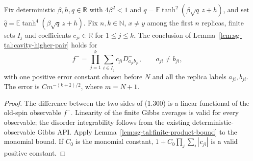 \begin{lemma}
\label{lem:sg-tal:cavity-higher-linear}
\leanok
{}
Fix deterministic $\beta,h,q\in\mathbb R$ with $4\beta^2<1$ and
$q=\mathbb E\tanh^2(\beta\sqrt q\,z+h)$, and set
$\widehat q=\mathbb E\tanh^4(\beta\sqrt q\,z+h)$.
Fix $n,k\in\mathbb N$, $x\ne y$ among the first $n$ replicas, finite sets $I_j$
and coefficients $c_{ji}\in\mathbb R$ for $1\le j\le k$.
The conclusion of Lemma~\ref{lem:sg-tal:cavity-higher-pair} holds for
\[
 f^-=\prod_{j=1}^k\sum_{i\in I_j}c_{ji}D^-_{a_{ji}b_{ji}},\qquad a_{ji}\ne b_{ji},
\]
with one positive error constant chosen before $N$ and all the replica labels $a_{ji},b_{ji}$.
The error is $C m^{-(k+2)/2}$, where $m=N+1$.
\end{lemma}
\begin{proof}
\leanok
The difference between the two sides of (1.300) is a linear functional of the old-spin
observable $f^-$. Linearity of the finite Gibbs averages is valid for every observable;
the disorder integrability follows from the existing deterministic-observable Gibbs API.
Apply Lemma~\ref{lem:sg-tal:finite-product-bound} to the monomial bound.
If $C_0$ is the monomial constant, $1+C_0\prod_j\sum_i|c_{ji}|$ is a valid positive constant.
\end{proof}

